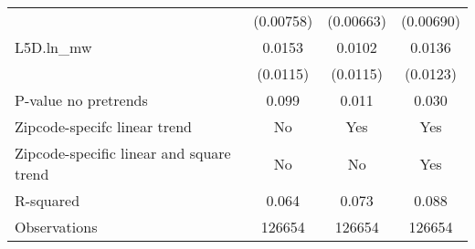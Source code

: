 {\begin{tabular}{l*{3}{c}}
          &(0.00758)         &(0.00663)         &(0.00690)         \\
[1em]
L5D.ln\_mw &   0.0153         &   0.0102         &   0.0136         \\
          & (0.0115)         & (0.0115)         & (0.0123)         \\
\hline
P-value no pretrends&    0.099         &    0.011         &    0.030         \\
Zipcode-specifc linear trend&       No         &      Yes         &      Yes         \\
Zipcode-specific linear and square trend&       No         &       No         &      Yes         \\
R-squared &    0.064         &    0.073         &    0.088         \\
Observations&   126654         &   126654         &   126654         \\
\hline\hline
\end{tabular}
}
